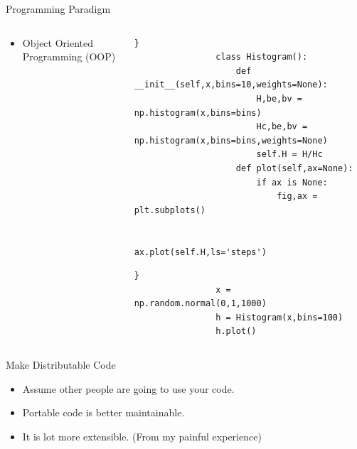 \documentclass[aspectratio=169]{beamer}
\begin{document}
\begin{frame}[fragile]{Programming Paradigm}
     \begin{columns}
        \begin{column}{0.39\textwidth}
            \begin{itemize}
                \item Object Oriented Programming (OOP)
            \end{itemize}
        \end{column}
        \begin{column}{0.59\textwidth}

            \begin{verbatim}}
                class Histogram():
                    def __init__(self,x,bins=10,weights=None):
                        H,be,bv = np.histogram(x,bins=bins)
                        Hc,be,bv = np.histogram(x,bins=bins,weights=None)
                        self.H = H/Hc
                    def plot(self,ax=None):
                        if ax is None:
                            fig,ax = plt.subplots()

                        ax.plot(self.H,ls='steps')
            \end{verbatim}

            \begin{verbatim}}
                x = np.random.normal(0,1,1000)
                h = Histogram(x,bins=100)
                h.plot()
            \end{verbatim}
        \end{column}
    \end{columns}
\end{frame} 
%
%
%
%
\begin{frame}[fragile]{Make Distributable Code}
    \begin{itemize}
        \item Assume other people are going to use your code.
        \item Portable code is better maintainable.
        \item It is lot more extensible. (From my painful experience)
    \end{itemize}
\end{frame} 
%
%
%
%
\end{document}
